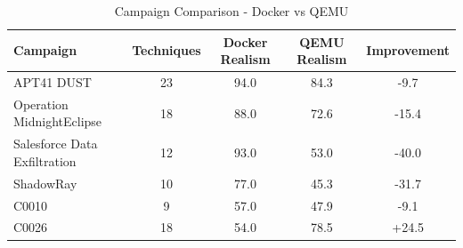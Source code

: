 \begin{table}[htbp]
\centering
\caption{Campaign Comparison - Docker vs QEMU}
\label{tab:campaign-comparison}
\begin{tabular}{lcccc}
\hline
\textbf{Campaign} & \textbf{Techniques} & \textbf{Docker Realism} & \textbf{QEMU Realism} & \textbf{Improvement} \\
\hline
APT41 DUST & 23 & 94.0 & 84.3 & -9.7 \\
Operation MidnightEclipse & 18 & 88.0 & 72.6 & -15.4 \\
Salesforce Data Exfiltration & 12 & 93.0 & 53.0 & -40.0 \\
ShadowRay & 10 & 77.0 & 45.3 & -31.7 \\
C0010 & 9 & 57.0 & 47.9 & -9.1 \\
C0026 & 18 & 54.0 & 78.5 & +24.5 \\
\hline
\end{tabular}
\end{table}
